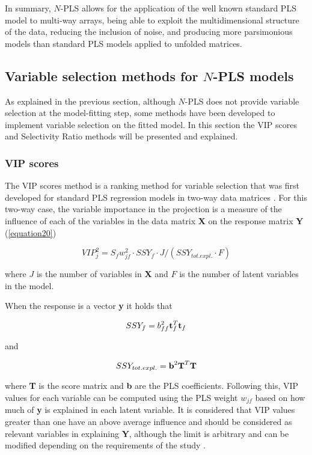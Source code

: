 In summary, $N$-PLS allows for the application of the well known standard PLS model to multi-way arrays, being able to exploit the multidimensional structure of the data, reducing the inclusion of noise, and producing more parsimonious models than standard PLS models applied to unfolded matrices. 

\subsection{Variable selection methods for $N$-PLS models}
As explained in the previous section, although $N$-PLS does not provide variable selection at the model-fitting step, some methods have been developed to implement variable selection on the fitted model. In this section the VIP scores and Selectivity Ratio methods will be presented and explained.

\subsubsection{VIP scores}
The VIP scores method is a ranking method for variable selection that was first developed for standard PLS regression models in two-way data matrices \parencite{wold2001pls, chong2005performance}. For this two-way case, the variable importance in the projection is a measure of the influence of each of the variables in the data matrix \textbf{X} on the response matrix \textbf{Y} (\autoref{equation20})

\begin{equation}
VIP^2_j=S_fw^2_{jf} \cdot SSY_f \cdot J/(SSY_{tot.expl.} \cdot F)
\label{equation20}
\end{equation}

where $J$ is the number of variables in \textbf{X} and $F$ is the number of latent variables in the model. 

When the response is a vector \textbf{y} it holds that

\begin{equation}
SSY_f=b^2_{ff}\textbf{\text{t}}_f^T\textbf{\text{t}}_f
\label{equation21}
\end{equation}

and

\begin{equation}
SSY_{tot.expl.}=\textbf{\text{b}}^2\textbf{\text{T}}^T\textbf{\text{T}}
\label{equation22}
\end{equation}

where \textbf{T} is the score matrix and \textbf{b} are the PLS coefficients. Following this, VIP values for each variable can be computed using the PLS weight $w_{jf}$ based on how much of \textbf{y} is explained in each latent variable. It is considered that VIP values greater than one have an above average influence and should be considered as relevant variables in explaining \textbf{Y}, although the limit is arbitrary and can be modified depending on the requirements of the study \parencite{akarachantachote2014cutoff}.

